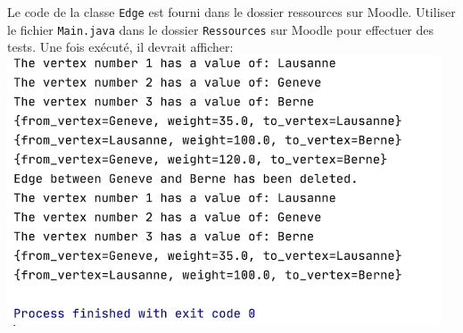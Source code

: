 
Le code de la classe \lstinline{Edge} est fourni dans le dossier ressources sur Moodle.
Utiliser le fichier \lstinline{Main.java} dans le dossier \lstinline{Ressources} sur Moodle pour effectuer des tests. Une fois exécuté, il devrait afficher:\\

    \includegraphics[height=8cm]{ressources/sortie_juste.PNG}

\newpage

